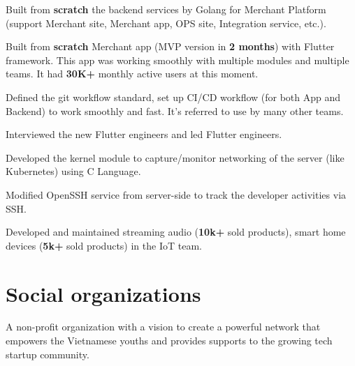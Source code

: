 \documentclass[]{deedy-resume-openfont}
\begin{document}
\begin{minipage}[t]{0.69\textwidth}
\begin{tightemize}
\item Built from \textbf{scratch} the backend services by Golang for Merchant Platform (support Merchant site, Merchant app, OPS site, Integration service, etc.).
\item Built from \textbf{scratch} Merchant app (MVP version in \textbf{2 months}) with Flutter framework. This app was working smoothly with multiple modules and multiple teams. It had \textbf{30K+} monthly active users at this moment.
\item Defined the git workflow standard, set up CI/CD workflow (for both App and Backend) to work smoothly and fast. It's referred to use by many other teams.
\item Interviewed the new Flutter engineers and led Flutter engineers. 
\end{tightemize}
\sectionsep

\begin{tightemize}
\item Developed the kernel module to capture/monitor networking of the server (like Kubernetes) using C Language.
\item Modified OpenSSH service from server-side to track the developer activities via SSH.
\end{tightemize}
\sectionsep

\begin{tightemize}
\item Developed and maintained streaming audio (\textbf{10k+} sold products), smart home devices (\textbf{5k+} sold products) in the IoT team.
\end{tightemize}
\sectionsep


\section{Social organizations}
A non-profit organization with a vision to create a powerful network that empowers the Vietnamese youths and provides supports to the growing tech startup community.
\sectionsep


\end{minipage}
\end{document}
